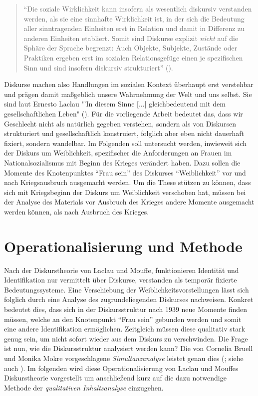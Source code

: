 \documentclass[12pt, titlepage=true, toc=bib]{scrartcl}
\begin{document}
\begin{singlespace*}
\begin{quote}
"`Die soziale Wirklichkeit kann insofern als wesentlich diskursiv verstanden werden, als sie eine sinnhafte Wirklichkeit ist, in der sich die Bedeutung aller sinntragenden Einheiten erst in Relation und damit in Differenz zu anderen Einheiten etabliert. Somit sind Diskurse explizit \textit{nicht} auf die Sphäre der Sprache begrenzt: Auch Objekte, Subjekte, Zustände oder Praktiken ergeben erst im sozialen Relationsgefüge einen je spezifischen Sinn und sind insofern diskursiv strukturiert"' (\cite[9; Hervorh. im Orig.]{nonhoff_diskurs_2007-1}).
\end{quote}
\end{singlespace*}

\noindent Diskurse machen also Handlungen im sozialen Kontext überhaupt erst verstehbar und prägen damit maßgeblich unsere Wahrnehmung der Welt und uns selbst. Sie sind laut Ernesto Laclau "'In diesem Sinne [...] gleichbedeutend mit dem gesellschaftlichen Leben" (\cite[29]{nonhoff_ideologie_2007}). Für die vorliegende Arbeit bedeutet das, dass wir Geschlecht nicht als natürlich gegeben verstehen, sondern als von Diskursen strukturiert und gesellschaftlich konstruiert, folglich aber eben nicht dauerhaft fixiert, sondern wandelbar. Im Folgenden soll untersucht werden, inwieweit sich der Diskurs um Weiblichkeit, spezifischer die Anforderungen an Frauen im Nationalsozialismus mit Beginn des Krieges verändert haben. Dazu sollen die Momente des Knotenpunktes "`Frau sein"' des Diskurses "`Weiblichkeit"' vor und nach Kriegsausbruch ausgemacht werden. Um die These stützen zu können, dass sich mit Kriegsbeginn der Diskurs um Weiblichkeit verschoben hat, müssen bei der Analyse des Materials vor Ausbruch des Krieges andere Momente ausgemacht werden können, als nach Ausbruch des Krieges. 

\section{Operationalisierung und Methode}

Nach der Diskurstheorie von Laclau und Mouffe, funktionieren Identität und Identifikation nur vermittelt über Diskurse, verstanden als temporär fixierte Bedeutungssysteme. Eine Verschiebung der Weiblichkeitsvorstellungen lässt sich folglich durch eine Analyse des zugrundeliegenden Diskurses nachweisen. Konkret bedeutet dies, dass sich in der Diskursstruktur nach 1939 neue Momente finden müssen, welche an den Knotenpunkt "`Frau sein"' gebunden werden und somit eine andere Identifikation ermöglichen. Zeitgleich müssen diese qualitativ stark genug sein, um nicht sofort wieder aus dem Diskurs zu verschwinden. Die Frage ist nun, wie die Diskursstruktur analysiert werden kann? Die von Cornelia Bruell und Monika Mokre vorgeschlagene \textit{Simultanzanalyse} leistet genau dies (\cite*{bruell_chancen_2006}; siehe auch \cite{nonhoff_kollektive_2007}). Im folgenden wird diese Operationalisierung von Laclau und Mouffes Diskurstheorie vorgestellt um anschließend kurz auf die dazu notwendige Methode der \textit{qualitativen Inhaltsanalyse} einzugehen.
\end{document}

